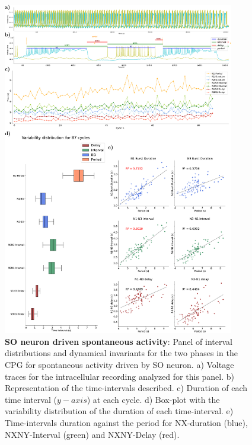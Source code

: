  
\begin{figure}[htbp]
	\centering
	\includegraphics[width=0.9\textwidth]{./img/invariants/data/SUSSEX/prep4_so_driven_2/images/panel_with_intervals.pdf}
	\caption{\textbf{SO neuron driven spontaneous activity}: Panel of interval distributions and dynamical invariants for the two phases in the CPG for spontaneous activity driven by SO neuron. a) Voltage traces for the intracellular recording analyzed for this panel. b) Representation of the time-intervals described. c) Duration of each time interval ($y-axis$) at each cycle. d) Box-plot with the variability distribution of the duration of each time-interval. e) Time-intervals duration against the period for NX-duration (blue), NXNY-Interval (green) and NXNY-Delay (red).}
	\label{fig:so spontaneous invariants 2}
\end{figure}


